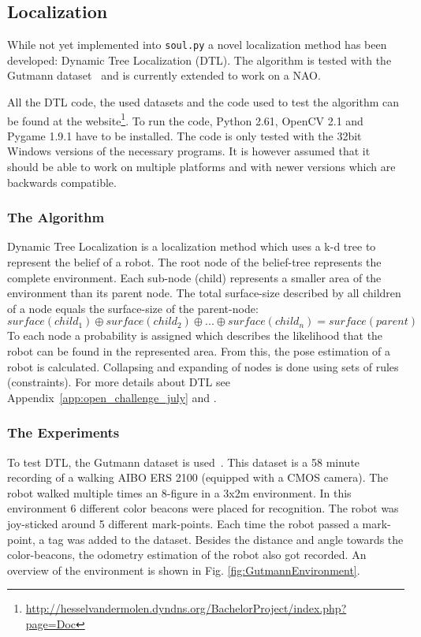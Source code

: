 \documentclass[11pt,a4paper,oneside]{article}
\begin{document}
\subsection{Localization}
While not yet implemented into \texttt{soul.py} a novel localization method has been developed: Dynamic Tree Localization (DTL). The algorithm is tested with the Gutmann dataset~\cite{Gutmann2002} and is currently extended to work on a NAO.

All the DTL code, the used datasets and the code used to test the algorithm can be found at the website\footnote{\url{http://hesselvandermolen.dyndns.org/BachelorProject/index.php?page=Doc}}. To run the code, Python 2.61, OpenCV 2.1 and Pygame 1.9.1 have to be installed. The code is only tested with the 32bit Windows versions of the necessary programs. It is however assumed that it should be able to work on multiple platforms and with newer versions which are backwards compatible.

\subsubsection{The Algorithm}
Dynamic Tree Localization is a localization method which uses a k-d tree \cite{Bentley1975} to represent the belief of a robot. The root node of the belief-tree represents the complete environment. Each sub-node (child) represents a smaller area of the environment than its parent node. The total surface-size described by all children of a node equals the surface-size of the parent-node:
$$
surface(child_1) \oplus surface(child_2) \oplus ... \oplus surface(child_n) = surface(parent)
$$
To each node a probability is assigned which describes the likelihood that the robot can be found in the represented area. From this, the pose estimation of a robot is calculated. Collapsing and expanding of nodes is done using sets of rules (constraints). For more details about DTL see Appendix~\ref{app:open_challenge_july} and \cite{BscThesisHesselDTL}.

\subsubsection{The Experiments}
To test DTL, the Gutmann dataset is used~\cite{Gutmann2002}. This dataset is a 58 minute recording of a walking AIBO ERS 2100 (equipped with a CMOS camera). The robot walked multiple times an 8-figure in a 3x2m environment. In this environment 6 different color beacons were placed for recognition. The robot was joy-sticked around 5 different mark-points. Each time the robot passed a mark-point, a tag was added to the dataset. Besides the distance and angle towards the color-beacons, the odometry estimation of the robot also got recorded. An overview of the environment is shown in Fig. \ref{fig:GutmannEnvironment}.
\end{document}
